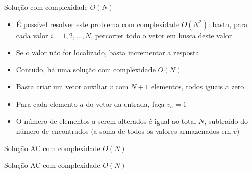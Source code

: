 \begin{frame}[fragile]{Solução com complexidade $O(N)$}

    \begin{itemize}
        \item É possível resolver este problema com complexidade $O(N^2)$: basta, para cada valor
            $i = 1, 2, \ldots, N$, percorrer todo o vetor em busca deste valor

        \item Se o valor não for localizado, basta incrementar a resposta

        \item Contudo, há uma solução com complexidade $O(N)$

        \item Basta criar um vetor auxiliar $v$ com $N + 1$ elementos, todos iguais a zero

        \item Para cada elemento $a$ do vetor da entrada, faça $v_a = 1$

        \item O número de elementos a serem alterados é igual ao total $N$, subtraído do 
            número de encontrados (a soma de todos os valores armazenados em $v$)
   \end{itemize}

\end{frame}

\begin{frame}[fragile]{Solução AC com complexidade $O(N)$}
\end{frame}

\begin{frame}[fragile]{Solução AC com complexidade $O(N)$}
\end{frame}
